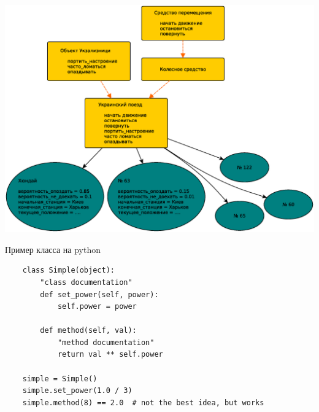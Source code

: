 \documentclass{article}
\begin{document}
\begin{center} \includegraphics[scale=0.8]{images/ukr_zalilnitsya.eps} \end{center}
\newpage

\begin{center} Пример класса на python \end{center}
\vspace{15pt}
\begin{lstlisting}
    class Simple(object):
        "class documentation"
        def set_power(self, power):
            self.power = power

        def method(self, val):
            "method documentation"
            return val ** self.power

    simple = Simple()
    simple.set_power(1.0 / 3)
    simple.method(8) == 2.0  # not the best idea, but works
\end{lstlisting}
\newpage
\end{document}
